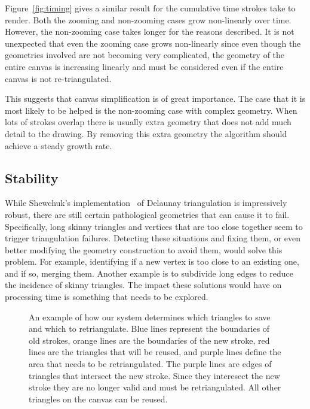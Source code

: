 \documentclass[review]{acmsiggraph}
\begin{document}
Figure~\ref{fig:timing} gives a similar result for the cumulative time strokes take to render. Both
the zooming and non-zooming cases grow non-linearly over time. However, the non-zooming case takes
longer for the reasons described. It is not unexpected that even the zooming case grows non-linearly
since even though the geometries involved are not becoming very complicated, the geometry of the entire
canvas is increasing linearly and must be considered even if the entire canvas is not re-triangulated.

This suggests that canvas simplification is of great importance.
The case that it is most likely to be helped is the non-zooming case with complex geometry. When lots of strokes
overlap there is usually extra geometry that does not add much detail to the drawing. By removing
this extra geometry the algorithm should achieve a steady growth rate.

\subsection{Stability} 

While Shewchuk's implementation~ of Delaunay triangulation is impressively robust, there are still certain pathological geometries that can cause it to fail.  Specifically, long skinny triangles and vertices that are too close together seem to trigger triangulation failures.  Detecting these situations and fixing them, or even better modifying the geometry construction to avoid them, would solve this problem.  For example, identifying if a new vertex is too close to an existing one, and if so, merging them.  Another example is to subdivide long edges to reduce the incidence of skinny triangles.  The impact these solutions would have on processing time is something that needs to be explored.

\begin{figure}
    \centering
    \caption{An example of how our system determines which triangles to save and which to retriangulate. Blue
    lines represent the boundaries of old strokes, orange lines are the boundaries of the new stroke, red lines are
    the triangles that will be reused, and purple lines define the area that needs to be retriangulated. The purple
    lines are edges of triangles that intersect the new stroke. Since they interesect the new stroke they are no
    longer valid and must be retriangulated. All other triangles on the canvas can be reused.}
    \label{fig:modified}
\end{figure}
\end{document}
